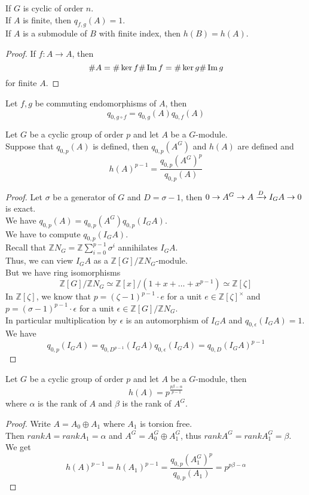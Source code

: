 \documentclass[../main.tex]{subfiles}
\begin{document}
\begin{thm}
	If $G$ is cyclic of order $n$.\\
	If $A$ is finite, then $q_{f,g} ( A) =1$.\\
	If $A$ is a submodule of $B$ with finite index, then $h( B)= h( A)  $.
\end{thm}
\begin{proof}
If $f:A\to A$, then
\[ 
\# A = \# \ker f \# \operatorname{Im} f = \# \ker g \# \operatorname{Im} g
\]
for finite $A$.
\end{proof}
\begin{lemma}
Let $f,g$ be commuting endomorphisms of $A$, then
\[ 
q_{0, g\circ f} = q_{0,g} ( A) q_{0,f} ( A) 
\]
\end{lemma}
\begin{thm}
	Let $G$ be a cyclic group of order $p$ and let $A$ be a $G$-module.\\
	Suppose that $q_{0,p} ( A) $ is defined, then $q_{0,p} ( A^{G}) $ and $h( A) $ are defined and
	\[ 
	h( A) ^{p-1}= \frac{q_{0,p} ( A^{G}) ^{p}}{q_{0,p} ( A) }
	\]
\end{thm}
\begin{proof}
Let $\sigma$ be a generator of $G$ and $D= \sigma-1$, then $0 \to A^{G}\to A \xrightarrow{D} I_G A \to 0$ is exact.\\
We have $q_{0,p} ( A) = q_{0,p} ( A^{G}) q_{0,p} ( I_G A) $.\\
We have to compute $q_{0,p} ( I_G A) $.\\
Recall that $\mathbb{Z} N_G = \mathbb{Z} \sum_{i=0} ^{p-1}\sigma^{i}$ annihilates $I_G A$.\\
Thus, we can view $I_G A$ as a $ \mathbb{Z}[G] / \mathbb{Z}N_G$-module.\\
But we have ring isomorphisms
\[ 
	\mathbb{Z}[G] / \mathbb{Z}N_G \simeq \mathbb{Z}[x] / ( 1+x+\ldots + x^{p-1}) \simeq \mathbb{Z}[\zeta]
\]
In $ \mathbb{Z}[\zeta]$, we know that $p = ( \zeta-1)^{p-1}\cdot e  $ for a unit $e \in \mathbb{Z}[\zeta]^{\times}$ and $p = ( \sigma-1)^{p-1}\cdot \epsilon $ for a unit $\epsilon \in \mathbb{Z}[G]/ \mathbb{Z}N_G$.\\
In particular multiplication by $\epsilon$ is an automorphism of $I_G A$ and $q_{0,\epsilon} ( I_G A) =1$.\\
We have
\[ 
q_{0,p} ( I_G A) = q_{0, D^{p-1}} ( I_G A) q_{0,\epsilon } ( I_G A) = q_{0,D} ( I_G A) ^{p-1}
\]

\end{proof}
\begin{thm}[Chevalley]
	Let $G$ be a cyclic group of order $p$ and let $A$ be a $G$-module, then
	\[ 
	h( A) = p^{ \frac{p\beta-\alpha}{p-1}}
	\]
	where $\alpha$ is the rank of $A$ and $\beta$ is the rank of $A^{G}$.
\end{thm}
\begin{proof}
Write $A= A_0\oplus A_1$ where $A_1$ is torsion free.\\
Then $rank A= rank A_1 = \alpha$ and $A^{G}= A_0^{G}\oplus A_1^{G}$, thus $rank A^{G}= rank A_1^{G}= \beta$.\\
We get 
\[ 
h( A) ^{p-1}= h( A_1) ^{p-1}= \frac{q_{0,p} ( A_1^{G}) ^{p}}{q_{0,p} ( A_1) }= p^{p\beta-\alpha}
\]

\end{proof}
\end{document}
